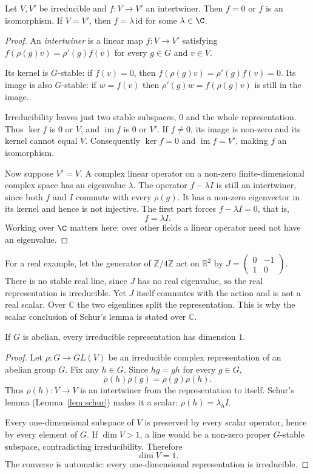 \begin{lemma}[Schur]\label{lem:schur}
Let $V,V'$ be irreducible and $f:V\to V'$ an intertwiner. Then $f=0$ or $f$ is an isomorphism. If $V=V'$, then $f=\lambda\,\mathrm{id}$ for some $\lambda\in\C$.
\end{lemma}
\begin{proof}
An \emph{intertwiner} is a linear map
$f:V\to V'$ satisfying
$f(\rho(g)v)=\rho'(g)f(v)$
for every $g\in G$ and $v\in V$.

Its kernel is $G$-stable: if $f(v)=0$,
then $f(\rho(g)v)=\rho'(g)f(v)=0$.
Its image is also $G$-stable:
if $w=f(v)$ then
$\rho'(g)w=f(\rho(g)v)$ is still
in the image.

Irreducibility leaves just two
stable subspaces, $0$ and the whole
representation. Thus $\ker f$
is $0$ or $V$, and $\operatorname{im}f$
is $0$ or $V'$. If $f\ne0$, its
image is non-zero and its kernel
cannot equal $V$.
Consequently $\ker f=0$ and
$\operatorname{im}f=V'$, making $f$
an isomorphism.

Now suppose $V'=V$.
A complex linear operator on a
non-zero finite-dimensional complex
space has an eigenvalue $\lambda$.
The operator $f-\lambda I$ is still
an intertwiner, since both $f$ and
$I$ commute with every $\rho(g)$.
It has a non-zero eigenvector in its
kernel and hence is not injective.
The first part forces
$f-\lambda I=0$, that is,
\[
\boxed{f=\lambda I}.
\]
Working over $\C$ matters here:
over other fields a linear operator
need not have an eigenvalue.
\end{proof}

For a real example, let the generator of $\mathbb Z/4\mathbb Z$ act on
$\mathbb R^2$ by $J=\begin{pmatrix}0&-1\\1&0\end{pmatrix}$.
There is no stable real line, since $J$ has no real eigenvalue, so the real
representation is irreducible. Yet $J$ itself commutes with the action and
is not a real scalar. Over $\mathbb C$ the two eigenlines split the representation.
This is why the scalar conclusion of Schur's lemma is stated over $\mathbb C$.

\begin{corollary}\label{cor:abelianirr}
If $G$ is abelian, every irreducible representation has dimension $1$.
\end{corollary}
\begin{proof}
Let $\rho:G\to GL(V)$ be an
irreducible complex representation
of an abelian group $G$.
Fix any $h\in G$. Since $hg=gh$
for every $g\in G$,
\[
\rho(h)\rho(g)=\rho(g)\rho(h).
\]
Thus $\rho(h):V\to V$ is an
intertwiner from the representation
to itself. Schur's lemma
(Lemma~\ref{lem:schur}) makes it
a scalar: $\rho(h)=\lambda_hI$.

Every one-dimensional subspace
of $V$ is preserved by every
scalar operator, hence by every
element of $G$. If $\dim V>1$,
a line would be a non-zero proper
$G$-stable subspace, contradicting
irreducibility. Therefore
\[
\boxed{\dim V=1}.
\]
The converse is automatic: every
one-dimensional representation is
irreducible.
\end{proof}

